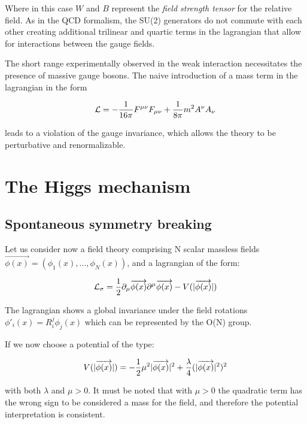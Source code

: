 Where in this case $W$ and $B$ represent the \emph{field strength tensor} for the relative field. As in the QCD formalism, the SU(2) generators do not commute with each other creating additional trilinear and quartic terms in the lagrangian that allow for interactions between the gauge fields.

The short range experimentally observed in the weak interaction necessitates the presence of massive gauge bosons. The naive introduction of a mass term in the lagrangian in the form

\begin{equation}
\mathcal{L} = -\frac{1}{16\pi}F^{\mu\nu}F_{\mu\nu}+\frac{1}{8\pi}m^2 A^{\nu}A_{\nu}
\label{eq:weak_free}
\end{equation}

leads to a violation of the gauge invariance, which allows the theory to be perturbative and renormalizable.

\section{The Higgs mechanism}

\subsection{Spontaneous symmetry breaking}

Let us consider now a field theory comprising N scalar massless fields $\vec{\phi(x)} = (\phi_1(x),\ldots,\phi_N(x))$, and a lagrangian of the form:

\begin{equation}
\mathcal{L}_\sigma = \dfrac{1}{2} \partial_\mu \overrightarrow{\phi(x)} \partial^\mu \overrightarrow{\phi(x)} - V(|\overrightarrow{\phi(x)}|)
\label{eq:lin_sigma}
\end{equation}

The lagrangian shows a global invariance under the field rotations $\phi'_i(x) = R_i^j \phi_j(x)$ which can be represented by the O(N) group. 

If we now choose a potential of the type:

\begin{equation}
V(|\overrightarrow{\phi(x)}|) = - \dfrac{1}{2} \mu^2 |\overrightarrow{\phi(x)}|^2 + \dfrac{\lambda}{4} (|\overrightarrow{\phi(x)}|^2)^2
\label{eq:lin_sigma}
\end{equation} 

with both $\lambda$ and $\mu > 0$. It must be noted that with $\mu > 0$ the quadratic term has the wrong sign to be considered a mass for the field, and therefore the potential interpretation is consistent.

